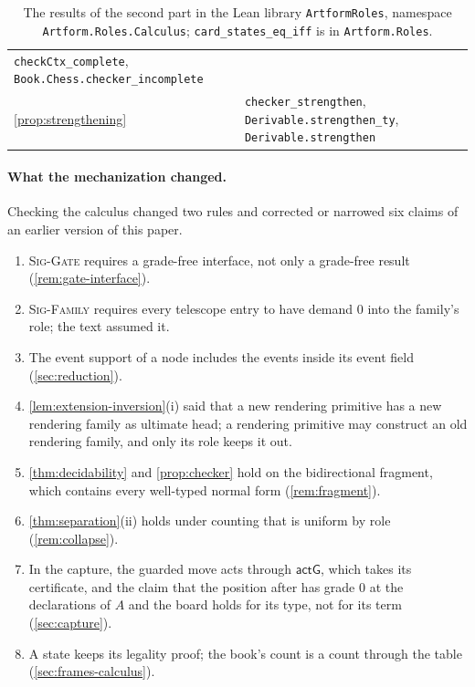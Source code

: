 \documentclass[11pt]{article}
\numberwithin{equation}{section}
\theoremstyle{definition}
\theoremstyle{plain}
\theoremstyle{remark}
\begin{document}
\begin{table}[tbp]
\begin{tabularx}{\textwidth}{@{}>{\raggedright\arraybackslash}p{}>{\raggedright\arraybackslash}X@{}}
\texttt{checkCtx\_complete}, \texttt{Book.Chess.checker\_incomplete}\\
\cref{prop:strengthening} & \texttt{checker\_strengthen},
\texttt{Derivable.strengthen\_ty}, \texttt{Derivable.strengthen}\\
\bottomrule
\end{tabularx}
\caption{The results of the second part in the Lean library
\texttt{ArtformRoles}, namespace \texttt{Artform.Roles.Calculus};
\texttt{card\_states\_eq\_iff} is in \texttt{Artform.Roles}.}
\label{tab:lean-calculus}
\end{table}

\paragraph{What the mechanization changed.}
Checking the calculus changed two rules and corrected or narrowed six
claims of an earlier version of this paper.
\begin{enumerate}[label=(\arabic*),leftmargin=2.2em]
\item \textsc{Sig-Gate} requires a grade-free interface, not only a
grade-free result (\cref{rem:gate-interface}).
\item \textsc{Sig-Family} requires every telescope entry to have demand \(0\)
into the family's role; the text assumed it.
\item The event support of a node includes the events inside its event field
(\cref{sec:reduction}).
\item \cref{lem:extension-inversion}(i) said that a new rendering primitive
has a new rendering family as ultimate head; a rendering primitive may
construct an old rendering family, and only its role keeps it out.
\item \cref{thm:decidability} and \cref{prop:checker} hold on the
bidirectional fragment, which contains every well-typed normal form
(\cref{rem:fragment}).
\item \cref{thm:separation}(ii) holds under counting that is uniform by role
(\cref{rem:collapse}).
\item In the capture, the guarded move acts through \(\mathsf{actG}\), which
takes its certificate, and the claim that the position after has grade \(0\)
at the declarations of \(A\) and the board holds for its type, not for its
term (\cref{sec:capture}).
\item A state keeps its legality proof; the book's count is a count through
the table (\cref{sec:frames-calculus}).
\end{enumerate}
\end{document}
